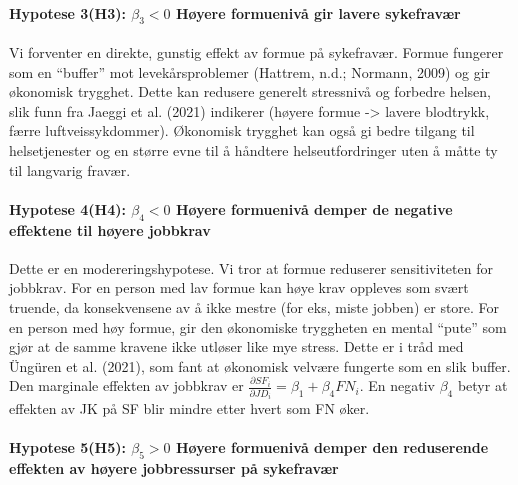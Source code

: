 \documentclass[
  12pt,
  a4paper,
  DIV=11,
  numbers=noendperiod]{scrartcl}
\let\oldparagraph\paragraph
\renewcommand{\paragraph}[1]{\oldparagraph{#1}\mbox{}}
\begin{document}
\paragraph{\texorpdfstring{Hypotese 3(H3): \(\beta_3 < 0\) Høyere
formuenivå gir lavere
sykefravær}{Hypotese 3(H3): \textbackslash beta\_3 \textless{} 0 Høyere formuenivå gir lavere sykefravær}}\label{hypotese-3h3-beta_3-0-huxf8yere-formuenivuxe5-gir-lavere-sykefravuxe6r}

Vi forventer en direkte, gunstig effekt av formue på sykefravær. Formue
fungerer som en ``buffer'' mot levekårsproblemer (Hattrem, n.d.;
Normann, 2009) og gir økonomisk trygghet. Dette kan redusere generelt
stressnivå og forbedre helsen, slik funn fra Jaeggi et al. (2021)
indikerer (høyere formue -\textgreater{} lavere blodtrykk, færre
luftveissykdommer). Økonomisk trygghet kan også gi bedre tilgang til
helsetjenester og en større evne til å håndtere helseutfordringer uten å
måtte ty til langvarig fravær.

\paragraph{\texorpdfstring{Hypotese 4(H4): \(\beta_4 < 0\) Høyere
formuenivå demper de negative effektene til høyere
jobbkrav}{Hypotese 4(H4): \textbackslash beta\_4 \textless{} 0 Høyere formuenivå demper de negative effektene til høyere jobbkrav}}\label{hypotese-4h4-beta_4-0-huxf8yere-formuenivuxe5-demper-de-negative-effektene-til-huxf8yere-jobbkrav}

Dette er en modereringshypotese. Vi tror at formue reduserer
sensitiviteten for jobbkrav. For en person med lav formue kan høye krav
oppleves som svært truende, da konsekvensene av å ikke mestre (for eks,
miste jobben) er store. For en person med høy formue, gir den økonomiske
tryggheten en mental ``pute'' som gjør at de samme kravene ikke utløser
like mye stress. Dette er i tråd med Üngüren et al. (2021), som fant at
økonomisk velvære fungerte som en slik buffer. Den marginale effekten av
jobbkrav er
\(\frac{\partial SF_i}{\partial JD_i} = \beta_1 + \beta_4 FN_i\). En
negativ \(\beta_4\) betyr at effekten av JK på SF blir mindre etter
hvert som FN øker.

\paragraph{\texorpdfstring{Hypotese 5(H5): \(\beta_5 > 0\) Høyere
formuenivå demper den reduserende effekten av høyere jobbressurser på
sykefravær}{Hypotese 5(H5): \textbackslash beta\_5 \textgreater{} 0 Høyere formuenivå demper den reduserende effekten av høyere jobbressurser på sykefravær}}\label{hypotese-5h5-beta_5-0-huxf8yere-formuenivuxe5-demper-den-reduserende-effekten-av-huxf8yere-jobbressurser-puxe5-sykefravuxe6r}
\end{document}
